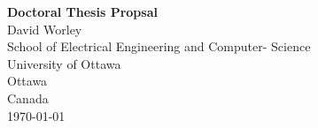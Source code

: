 \documentclass{article}
\theoremstyle{definition}
\begin{document}
\begin{titlepage}
\begin{center}
    \Huge \textbf{Doctoral Thesis Propsal} \\
    \vspace{.5cm}
    \LARGE David Worley \\
    \vfill
    \large
    School of Electrical Engineering and Computer- Science \\
    University of Ottawa\\
    Ottawa \\
    Canada \\
    \today
\end{center}
\end{titlepage}






\end{document}
